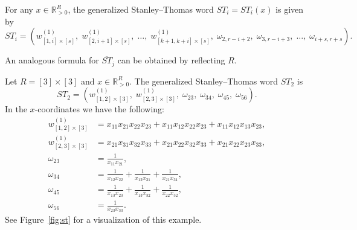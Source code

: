 \documentclass[ALCO,Unicode,published]{cedram}
\numberwithin{equation}{section}
\newcommand{\ST}{ST}
\begin{document}
\begin{Prop} \label{prop:st}
For any $x \in \mathbb R^R_{>0}$, the generalized Stanley--Thomas word $ST_i = ST_i(x)$ is given by
\begin{equation*}
    ST_i = (w^{(1)}_{[1,i] \times [s]}, \; w^{(1)}_{[2,i+1] \times [s]}, \; \dots, \; w^{(1)}_{[k+1,k+i] \times [s]}, \;
    \omega_{2,r-i+2}, \; \omega_{3,r-i+3}, \; \dots, \; \omega_{i+s,r+s}).
\end{equation*}
\end{Prop}
An analogous formula for $\overline{ST}_j$ can be obtained by reflecting $R$.

\begin{Ex} \label{ex:st}
Let $R = [3] \times [3]$ and $x \in \mathbb R^R_{>0}$. The generalized Stanley--Thomas word $ST_2$ is 
\[\ST_2 = (w^{(1)}_{[1,2] \times [3]}, \;w^{(1)}_{[2,3] \times [3]}, \;\omega_{23},\; \omega_{34},\; \omega_{45},\; \omega_{56}).\]
In the $x$-coordinates we have the following:
\begin{align*}
    w^{(1)}_{[1,2] \times [3]} &= x_{11}x_{21}x_{22}x_{23}+x_{11}x_{12}x_{22}x_{23}+x_{11}x_{12}x_{13}x_{23},
    \\
    w^{(1)}_{[2,3] \times [3]} &= x_{21}x_{31}x_{32}x_{33}+x_{21}x_{22}x_{32}x_{33}+x_{21}x_{22}x_{23}x_{33},\\
    \omega_{23} &= \frac{1}{x_{11}x_{21}}, \\
    \omega_{34} &= \frac{1}{x_{12}x_{22}} + \frac{1}{x_{12}x_{31}} + \frac{1}{x_{21}x_{31}}, \\
    \omega_{45} &= \frac{1}{x_{13}x_{23}} + \frac{1}{x_{13}x_{32}} + \frac{1}{x_{22}x_{32}}, \\
    \omega_{56} &= \frac{1}{x_{23}x_{33}}.
\end{align*}
See Figure~\ref{fig:st} for a visualization of this example.
\end{Ex}
\end{document}
